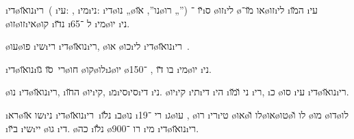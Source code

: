 
\newcommand{\level}{100}

\newcommand{\dinozaurim}{\i{די}\o{נו}\u{או}\i{רי}\s{ם}}



\colInvisibone

\dinozaurim\ ( \i{עי}: , \i{מי}\i{ני}:  \i{די}\o{נו} „\o{נו}”,  \u{או}\o{רו} „”) \u{יו} ־\i{ס}  \o{זו}\i{לי} \o{או} \u{מו}־\o{זו}\i{לי} \i{ה}\u{מו} \i{עי} \o{זו}\o{זו}\i{אי}\o{קו} \i{נ}\u{דו} \i{ל} ־65 \i{מי}\o{יו} \i{ני}.

\o{עו}\o{פו}   \i{שי}\i{רי}  \dinozaurim, \o{או}  \o{כו}\i{לי}  \dinozaurim\ .

\dinozaurim\ \u{סו} \u{גו}\o{חו} \o{קו}\o{לו}\i{ג}\o{יו} \o{בו}   \u{דו} ,  ־150 \i{מי}\o{יו} \i{ני}.

\o{נו} \dinozaurim, \i{ה}\u{חו} \o{יו}\i{קי}, \i{מ}\i{סי}\i{סי}\i{די} \i{ני}. \o{יו}\i{קי} \i{תי}\i{די} \i{הי} \i{ני} \u{ו}\u{מו} \i{רי}, \i{כ}  \o{סו} \i{עי} \dinozaurim.

\i{רא}\o{שו} \u{או}\i{ני}  \dinozaurim\ \i{נ}\u{לו} \i{ב}\o{נו} \i{רי}   ־19   \i{ג}\o{עו} , \o{רו} \i{רי}\i{טי}  \o{או}\o{לו} \u{ו}\o{או}\o{טו}\o{לו} \u{ו} \o{מו} \o{דו}\o{לו} \i{ב}\u{יו} \i{שי}\i{יי} \o{גו}  \i{די}.
 \o{כה} \i{נ}\u{לו} \o{רו} ־900 \i{מי} \dinozaurim.

